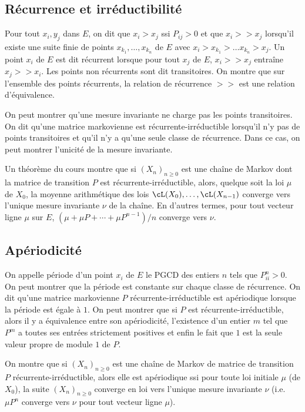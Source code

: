 %
\subsection{Récurrence et irréductibilité}
%

Pour tout $x_i,y_j$ dans $E$, on dit que $x_i > x_j$ ssi $P_{ij}>0$ et que
$x_i >> x_j$ lorsqu'il existe une suite finie de points
$x_{k_1},\ldots,x_{k_n}$ de $E$ avec $x_i > x_{k_1} > \ldots x_{k_n} > x_j$.
Un point $x_i$ de $E$ est dit récurrent lorsque pour tout $x_j$ de $E$, $x_i
>> x_j$ entraîne $x_j >> x_i$. Les points non récurrents sont dit
transitoires. On montre que sur l'ensemble des points récurrents, la relation
de récurrence $>>$ est une relation d'équivalence. 

On peut montrer qu'une mesure invariante ne charge pas les points transitoires.
On dit qu'une matrice markovienne est récurrente-irréductible lorsqu'il n'y
pas de points transitoires et qu'il n'y a qu'une seule classe de récurrence.
Dans ce cas, on peut montrer l'unicité de la mesure invariante.

Un théorème du cours montre que si $(X_n)_{n\geq 0}$ est une chaîne de Markov
dont la matrice de transition $P$ est récurrente-irréductible, alors, quelque
soit la loi $\mu$ de $X_0$, la moyenne arithmétique des lois
$\cL(X_0),\ldots,\cL(X_{n-1})$ converge vers l'unique mesure
invariante $\nu$ de la chaîne. En d'autres termes, pour tout vecteur ligne
$\mu$ sur $E$, $(\mu+\mu P + \cdots + \mu P^{n-1})/n$ converge vers $\nu$.

%
\subsection{Apériodicité}
%

On appelle période d'un point $x_i$ de $E$ le PGCD des entiers $n$ tels que
$P^n_{ii}>0$. On peut montrer que la période est constante sur chaque classe
de récurrence. On dit qu'une matrice markovienne $P$ récurrente-irréductible
est apériodique lorsque la période est égale à $1$. On peut montrer que si $P$
est récurrente-irréductible, alors il y a équivalence entre son apériodicité,
l'existence d'un entier $m$ tel que $P^m$ a toutes ses entrées strictement
positives et enfin le fait que $1$ est la seule valeur propre de module $1$ de
$P$.

On montre que si $(X_n)_{n\geq 0}$ est une chaîne de Markov de matrice de
transition $P$ récurrente-irréductible, alors elle est apériodique ssi pour
toute loi initiale $\mu$ (de $X_0$), la suite $(X_n)_{n\geq 0}$ converge en
loi vers l'unique mesure invariante $\nu$ (i.e. $\mu P^n$ converge vers $\nu$
pour tout vecteur ligne $\mu$).

